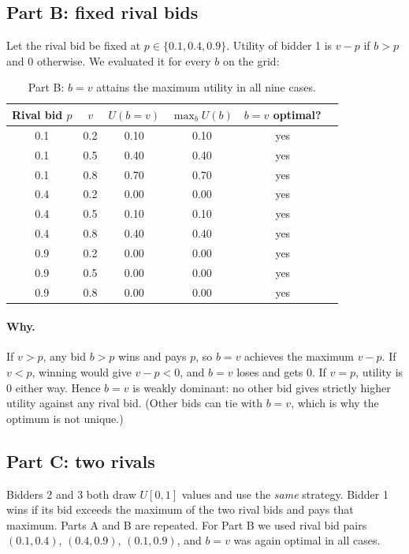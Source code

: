 \documentclass[11pt,a4paper]{article}
\begin{document}
\subsection{Part B: fixed rival bids}
Let the rival bid be fixed at $p\in\{0.1,0.4,0.9\}$. Utility of bidder 1 is $v-p$ if $b>p$ and $0$ otherwise. We evaluated it for every $b$ on the grid:

\begin{table}[H]
\centering
\begin{tabular}{cccccc}
\toprule
Rival bid $p$ & $v$ & $U(b=v)$ & $\max_b U(b)$ & $b=v$ optimal?\\
\midrule
0.1 & 0.2 & 0.10 & 0.10 & yes\\
0.1 & 0.5 & 0.40 & 0.40 & yes\\
0.1 & 0.8 & 0.70 & 0.70 & yes\\
0.4 & 0.2 & 0.00 & 0.00 & yes\\
0.4 & 0.5 & 0.10 & 0.10 & yes\\
0.4 & 0.8 & 0.40 & 0.40 & yes\\
0.9 & 0.2 & 0.00 & 0.00 & yes\\
0.9 & 0.5 & 0.00 & 0.00 & yes\\
0.9 & 0.8 & 0.00 & 0.00 & yes\\
\bottomrule
\end{tabular}
\caption{Part B: $b=v$ attains the maximum utility in all nine cases.}
\end{table}

\paragraph{Why.} If $v>p$, any bid $b>p$ wins and pays $p$, so $b=v$ achieves the maximum $v-p$. If $v<p$, winning would give $v-p<0$, and $b=v$ loses and gets $0$. If $v=p$, utility is $0$ either way. Hence $b=v$ is weakly dominant: no other bid gives strictly higher utility against any rival bid. (Other bids can tie with $b=v$, which is why the optimum is not unique.)

\subsection{Part C: two rivals}
Bidders 2 and 3 both draw $U[0,1]$ values and use the \emph{same} strategy. Bidder 1 wins if its bid exceeds the maximum of the two rival bids and pays that maximum. Parts A and B are repeated. For Part B we used rival bid pairs $(0.1,0.4)$, $(0.4,0.9)$, $(0.1,0.9)$, and $b=v$ was again optimal in all cases.
\end{document}
